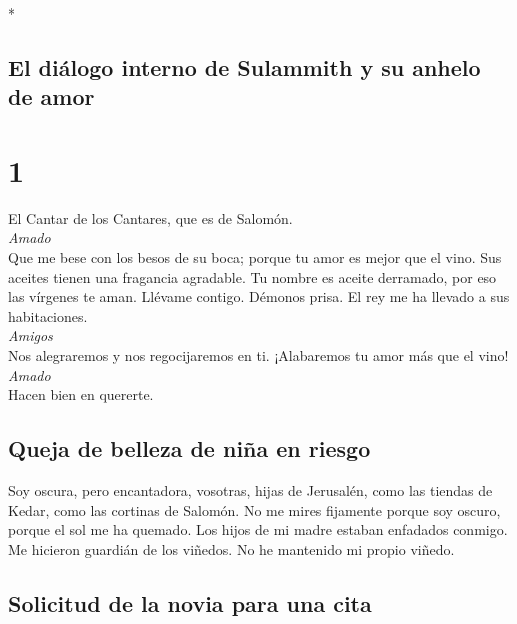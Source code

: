 \begin{paracol}{2} \switchcolumn[0]*

\hypertarget{el-diuxe1logo-interno-de-sulammith-y-su-anhelo-de-amor}{%
\subsection{El diálogo interno de Sulammith y su anhelo de
amor}\label{el-diuxe1logo-interno-de-sulammith-y-su-anhelo-de-amor}}

\hypertarget{section}{%
\section{1}\label{section}}

 El Cantar de los Cantares, que es de Salomón.\\
\emph{Amado}\\
 Que me bese con los besos de su boca; porque tu amor es
mejor que el vino.  Sus aceites tienen una fragancia
agradable. Tu nombre es aceite derramado, por eso las vírgenes te aman.
 Llévame contigo. Démonos prisa. El rey me ha llevado a
sus habitaciones.\\
\emph{Amigos}\\
Nos alegraremos y nos regocijaremos en ti. ¡Alabaremos tu amor más que
el vino!\\
\emph{Amado}\\
Hacen bien en quererte.

\hypertarget{queja-de-belleza-de-niuxf1a-en-riesgo}{%
\subsection{Queja de belleza de niña en
riesgo}\label{queja-de-belleza-de-niuxf1a-en-riesgo}}

 Soy oscura, pero encantadora, vosotras, hijas de
Jerusalén, como las tiendas de Kedar, como las cortinas de Salomón.
 No me mires fijamente porque soy oscuro, porque el sol me
ha quemado. Los hijos de mi madre estaban enfadados conmigo. Me hicieron
guardián de los viñedos. No he mantenido mi propio viñedo.

\hypertarget{solicitud-de-la-novia-para-una-cita}{%
\subsection{Solicitud de la novia para una
cita}\label{solicitud-de-la-novia-para-una-cita}}


\end{paracol}
